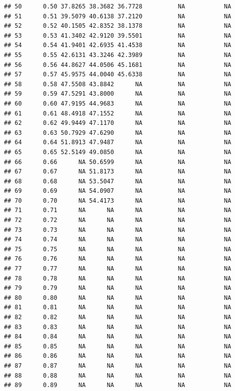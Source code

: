 \documentclass{article}\usepackage[]{graphicx}\usepackage[]{color}
\makeatletter
\newenvironment{kframe}{%
 \def\at@end@of@kframe{}%
 \ifinner\ifhmode%
  \def\at@end@of@kframe{\end{minipage}}%
  \begin{minipage}{\columnwidth}%
 \fi\fi%
 \def\FrameCommand##1{\hskip\@totalleftmargin \hskip-\fboxsep
 \colorbox{shadecolor}{##1}\hskip-\fboxsep
     \hskip-\linewidth \hskip-\@totalleftmargin \hskip\columnwidth}%
 \MakeFramed {\advance\hsize-\width
   \@totalleftmargin\z@ \linewidth\hsize
   \@setminipage}}%
 {\par\unskip\endMakeFramed%
 \at@end@of@kframe}
\newenvironment{knitrout}{}{} %
\makeatother
\begin{document}
\begin{knitrout}
\begin{kframe}
\begin{verbatim}
## 50      0.50 37.8265 38.3682 36.7728          NA           NA
## 51      0.51 39.5079 40.6138 37.2120          NA           NA
## 52      0.52 40.1505 42.8352 38.1378          NA           NA
## 53      0.53 41.3402 42.9120 39.5501          NA           NA
## 54      0.54 41.9401 42.6935 41.4538          NA           NA
## 55      0.55 42.6131 43.3246 42.3989          NA           NA
## 56      0.56 44.8627 44.0506 45.1681          NA           NA
## 57      0.57 45.9575 44.0040 45.6338          NA           NA
## 58      0.58 47.5508 43.8842      NA          NA           NA
## 59      0.59 47.5291 43.8000      NA          NA           NA
## 60      0.60 47.9195 44.9683      NA          NA           NA
## 61      0.61 48.4918 47.1552      NA          NA           NA
## 62      0.62 49.9449 47.1170      NA          NA           NA
## 63      0.63 50.7929 47.6290      NA          NA           NA
## 64      0.64 51.8913 47.9487      NA          NA           NA
## 65      0.65 52.5149 49.0850      NA          NA           NA
## 66      0.66      NA 50.6599      NA          NA           NA
## 67      0.67      NA 51.8173      NA          NA           NA
## 68      0.68      NA 53.5047      NA          NA           NA
## 69      0.69      NA 54.0907      NA          NA           NA
## 70      0.70      NA 54.4173      NA          NA           NA
## 71      0.71      NA      NA      NA          NA           NA
## 72      0.72      NA      NA      NA          NA           NA
## 73      0.73      NA      NA      NA          NA           NA
## 74      0.74      NA      NA      NA          NA           NA
## 75      0.75      NA      NA      NA          NA           NA
## 76      0.76      NA      NA      NA          NA           NA
## 77      0.77      NA      NA      NA          NA           NA
## 78      0.78      NA      NA      NA          NA           NA
## 79      0.79      NA      NA      NA          NA           NA
## 80      0.80      NA      NA      NA          NA           NA
## 81      0.81      NA      NA      NA          NA           NA
## 82      0.82      NA      NA      NA          NA           NA
## 83      0.83      NA      NA      NA          NA           NA
## 84      0.84      NA      NA      NA          NA           NA
## 85      0.85      NA      NA      NA          NA           NA
## 86      0.86      NA      NA      NA          NA           NA
## 87      0.87      NA      NA      NA          NA           NA
## 88      0.88      NA      NA      NA          NA           NA
## 89      0.89      NA      NA      NA          NA           NA

\end{verbatim}
\end{kframe}
\end{knitrout}
\end{document}
